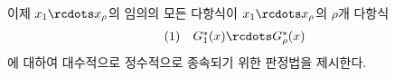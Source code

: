 
이제 $x_1\rcdots x_\rho$의 임의의 모든 다항식이 $x_1\rcdots x_\rho$의 $\rho$개 다항식
\[
\begin{array}{@{}l@{\quad}c@{}}
(1)& G_1^*(x)\rcdots G_\rho^*(x)
\end{array}
\]
에 대하여 대수적으로 정수적으로 종속되기 위한 판정법을 제시한다.
